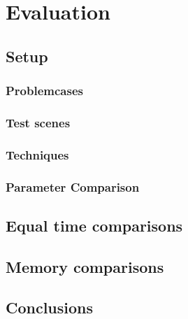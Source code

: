 \chapter{Evaluation}
\label{ch:Evaluation}

\section{Setup}

\subsection{Problemcases}


\subsection{Test scenes}


\subsection{Techniques}


\subsection{Parameter Comparison}


\section{Equal time comparisons}

\section{Memory comparisons}

\section{Conclusions}
